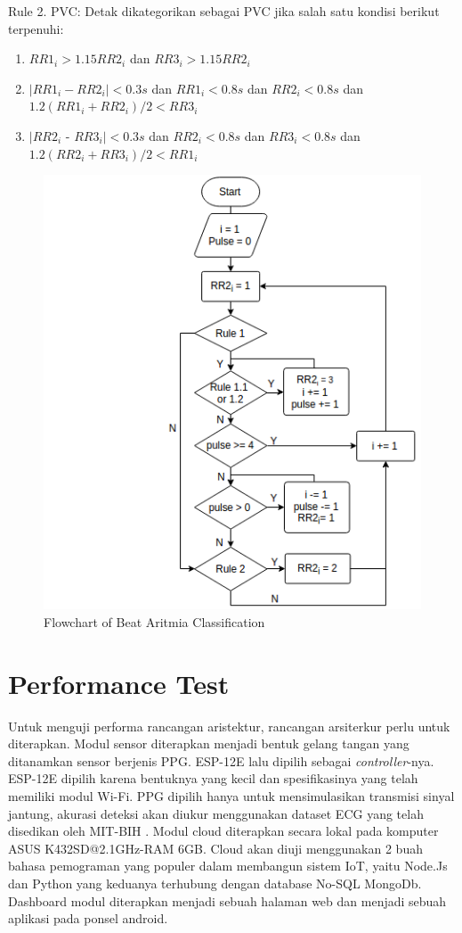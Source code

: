 \documentclass[]{indojc}
\begin{document}
Rule 2. PVC: Detak dikategorikan sebagai PVC jika salah satu kondisi berikut terpenuhi:

\begin{enumerate}
	\item $RR1_i > 1.15RR2_i$ dan $RR3_i > 1.15RR2_i$
	\item $|RR1_i - RR2_i| < 0.3s$ dan $RR1_i < 0.8s$ dan $RR2_i < 0.8s$ dan $1.2(RR1_i + RR2_i)/2 < RR3_i$
	\item $|RR2_i$ - $RR3_i| < 0.3s$ dan $RR2_i < 0.8s$ dan $RR3_i < 0.8s$ dan $1.2(RR2_i + RR3_i)/2 < RR1_i$
\end{enumerate}

\begin{figure}[htbp]
\centerline{\includegraphics[scale=0.55]{images/flowchart_aritmia.png}}
\caption{Flowchart of Beat Aritmia Classification}
\label{fig:flowchart_aritmia}
\end{figure}

\section{Performance Test}
Untuk menguji performa rancangan aristektur, rancangan arsiterkur perlu untuk diterapkan. Modul sensor diterapkan menjadi bentuk gelang tangan yang ditanamkan sensor berjenis PPG. ESP-12E lalu dipilih sebagai \textit{controller}-nya. ESP-12E dipilih karena bentuknya yang kecil dan spesifikasinya yang telah memiliki modul Wi-Fi. PPG dipilih hanya untuk mensimulasikan transmisi sinyal jantung, akurasi deteksi akan diukur menggunakan dataset ECG yang telah disedikan oleh MIT-BIH \cite{mit_bih_paper, physionet}. Modul cloud diterapkan secara lokal pada komputer ASUS K432SD@2.1GHz-RAM 6GB. Cloud akan diuji menggunakan 2 buah bahasa pemograman yang populer dalam membangun sistem IoT, yaitu Node.Js dan Python yang keduanya terhubung dengan database No-SQL MongoDb. Dashboard modul diterapkan menjadi sebuah halaman web dan menjadi sebuah aplikasi pada ponsel android.
\end{document}
